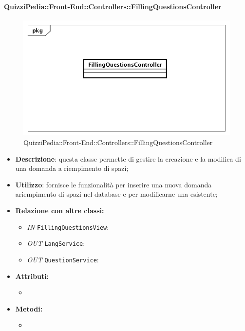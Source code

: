 \paragraph{QuizziPedia::Front-End::Controllers::FillingQuestionsController}
\begin{figure}
	\centering
	\includegraphics[scale=0.45]{UML/Classi/Front-End/QuizziPedia_Front-end_Controller_FillingQuestionsController.png}
	\caption{QuizziPedia::Front-End::Controllers::FillingQuestionsController}
\end{figure}
\begin{itemize}
	\item \textbf{Descrizione}: questa classe permette di gestire la creazione e la modifica di una domanda a riempimento di spazi;
	\item \textbf{Utilizzo}: fornisce le funzionalità per inserire una nuova domanda ariempimento di spazi nel database e per modificarne una esistente;
	\item \textbf{Relazione con altre classi:}
	\begin{itemize}
		\item \textit{IN} \texttt{FillingQuestionsView}:  
		\item \textit{OUT} \texttt{LangService}: 
		\item \textit{OUT} \texttt{QuestionService}:
	\end{itemize}
	\item \textbf{Attributi:}
	\begin{itemize}
		\item 
	\end{itemize}
	\item \textbf{Metodi:}
	\begin{itemize}
		\item 
	\end{itemize}
\end{itemize}

